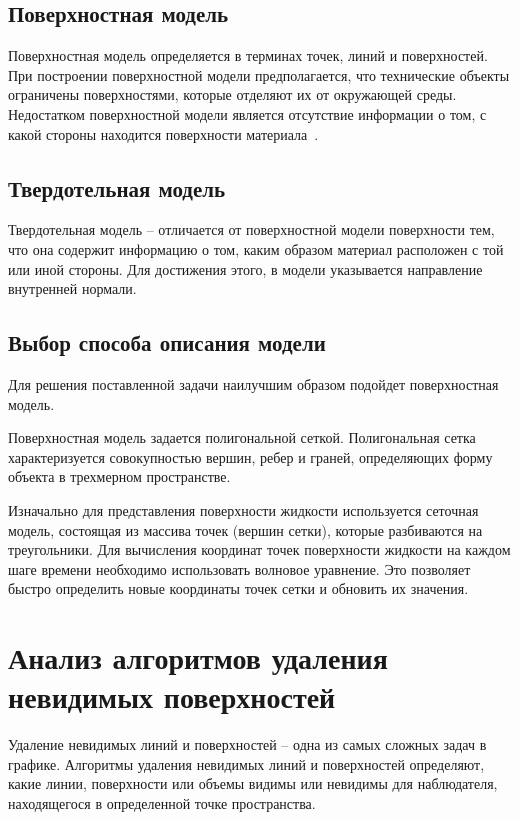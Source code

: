 \subsection{Поверхностная модель}
Поверхностная модель определяется в терминах точек, линий и поверхностей. 
При построении поверхностной модели предполагается, что технические объекты ограничены поверхностями, которые отделяют их от окружающей среды. 
Недостатком поверхностной модели является отсутствие информации о том, с какой стороны находится поверхности материала~\cite{MTM}.

\subsection{Твердотельная модель}
Твердотельная модель -- отличается от поверхностной модели поверхности тем, что она содержит информацию о том, каким образом материал расположен с той или иной стороны. 
Для достижения этого, в модели указывается направление внутренней нормали.

\subsection{Выбор способа описания модели}

Для решения поставленной задачи наилучшим образом подойдет поверхностная модель.

Поверхностная модель задается полигональной сеткой. 
Полигональная сетка характеризуется совокупностью вершин, ребер и граней, определяющих форму объекта в трехмерном пространстве.

Изначально для представления поверхности жидкости используется сеточная модель, состоящая из массива точек (вершин сетки), которые разбиваются на треугольники. 
Для вычисления координат точек поверхности жидкости на каждом шаге времени необходимо использовать волновое уравнение. 
Это позволяет быстро определить новые координаты точек сетки и обновить их значения.

\newpage 

\section{Анализ алгоритмов удаления невидимых поверхностей}

Удаление невидимых линий и поверхностей -- одна из самых сложных задач в графике. 
Алгоритмы удаления невидимых линий и поверхностей определяют, какие линии, поверхности или объемы видимы или невидимы для наблюдателя, находящегося в определенной точке пространства.


